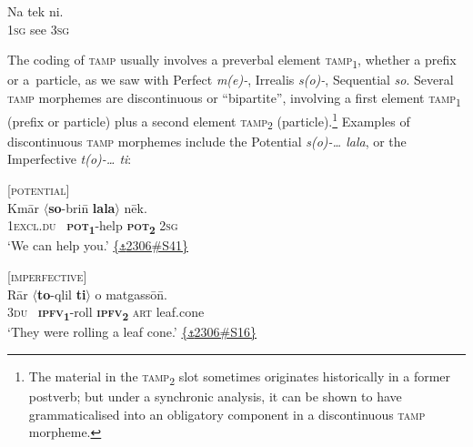 \documentclass[output=paper,colorlinks,citecolor=brown,draft]{langscibook}
\begin{document}
\ea\label{ex:dor:natekni} 
    \gll  *Na tek ni.\\ 
           \textsc{\textsc{1sg}} see \textsc{\textsc{3sg}}\\
    \glt 
\z

The coding of \textsc{tamp} usually involves a preverbal element \textsc{tamp}\textsubscript{1}, whether a \mbox{prefix} or a~particle, as we saw with Perfect \textit{m(e)-}, Irrealis \textit{s(o)-}, Sequential \textit{so}. \mbox{Several} \textsc{tamp} morphemes are discontinuous or “bipartite”, involving a first element \textsc{tamp}\textsubscript{1} (prefix or particle) plus a second element \textsc{tamp}\textsubscript{2} (particle).\footnote{The material in the \textsc{tamp}\textsubscript{2} slot sometimes originates historically in a former postverb; but under a synchronic analysis, it can be shown to have grammaticalised into an obligatory component in a discontinuous \textsc{tamp} morpheme.} Examples of discontinuous \textsc{tamp} morphemes include the Potential \textit{s(o)-… lala}, or the Imperfective \textit{t(o)-… ti}:
    
\ea\label{ex:dor:lala}  [\textsc{potential}]\\
    \gll  Kmār \textrm{${\langle}$}\textbf{so}-bri\={n} \textbf{lala}\textrm{${\rangle}$} nēk.\\  
          \textsc{1excl.du} ~\textbf{\textsc{pot}\textsubscript{1}}-help \textbf{\textsc{pot}\textsubscript{2}} \textsc{2sg}\\
    \glt ‘We can help you.’ \quad  \href{https://doi.org/10.24397/pangloss-0002306#S41}{\{\texttt{⚓}2306\#S41\}}
\z 

\ea\label{ex:dor:cone} [\textsc{imperfective}] \\
    \gll  Rār \textrm{${\langle}$}\textbf{to}-qlil \textbf{ti}\textrm{${\rangle}$} o matgassō\={n}.\\
          \textsc{3du} ~\textbf{\textsc{ipfv}\textsubscript{1}}-roll \textbf{\textsc{ipfv}\textsubscript{2}} \textsc{art} leaf.cone\\
    \glt  ‘They were rolling a leaf cone.’ \quad  \href{https://doi.org/10.24397/pangloss-0002306#S16}{\{\texttt{⚓}2306\#S16\}}
\z 
\end{document}
